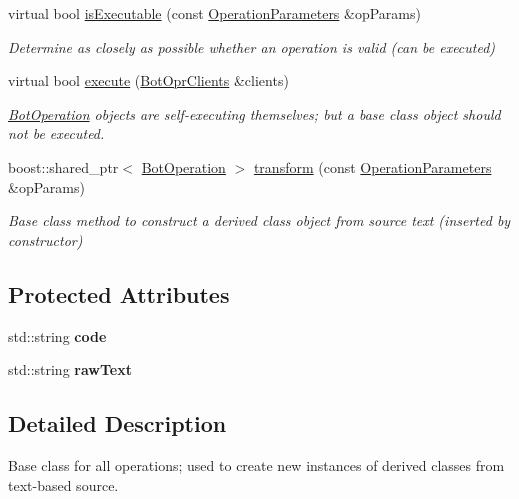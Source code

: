 \begin{DoxyCompactItemize}
\item 
virtual bool \hyperlink{classBotOperation_a0ed080d4c88b9ee0422666de169fb4a6}{is\-Executable} (const \hyperlink{classOperationParameters}{Operation\-Parameters} \&op\-Params)
\begin{DoxyCompactList}\small\item\em Determine as closely as possible whether an operation is valid (can be executed) \end{DoxyCompactList}\item 
virtual bool \hyperlink{classBotOperation_ae1e806e3c0044dc0177e73a7d05711ba}{execute} (\hyperlink{classBotOprClients}{Bot\-Opr\-Clients} \&clients)
\begin{DoxyCompactList}\small\item\em \hyperlink{classBotOperation}{Bot\-Operation} objects are self-\/executing themselves; but a base class object should not be executed. \end{DoxyCompactList}\item 
boost\-::shared\-\_\-ptr$<$ \hyperlink{classBotOperation}{Bot\-Operation} $>$ \hyperlink{classBotOperation_a894e399d0cc8e564831dc4cecd363c09}{transform} (const \hyperlink{classOperationParameters}{Operation\-Parameters} \&op\-Params)
\begin{DoxyCompactList}\small\item\em Base class method to construct a derived class object from source text (inserted by constructor) \end{DoxyCompactList}\end{DoxyCompactItemize}
\subsection*{Protected Attributes}
\begin{DoxyCompactItemize}
\item 
\hypertarget{classBotOperation_ae5b6b68a246f5d55b67f0f26939a5f95}{std\-::string {\bfseries code}}\label{classBotOperation_ae5b6b68a246f5d55b67f0f26939a5f95}

\item 
\hypertarget{classBotOperation_a256d5a82958cdd1f00d441c2e5ae6a37}{std\-::string {\bfseries raw\-Text}}\label{classBotOperation_a256d5a82958cdd1f00d441c2e5ae6a37}

\end{DoxyCompactItemize}


\subsection{Detailed Description}
Base class for all operations; used to create new instances of derived classes from text-\/based source. 

